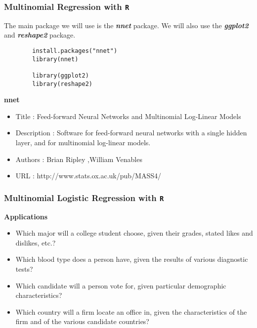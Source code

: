 \documentclass[00-GLMregslides.tex]{subfiles}
\begin{document}
\begin{frame}[fragile]
\frametitle{Multinomial Regression with \texttt{R}}
	\Large
	The main package we will use is the \textbf{\textit{nnet}} package. We will also use the \textbf{\textit{ggplot2}} and \textbf{\textit{reshape2}} package. 
	
	\begin{framed}
		\begin{verbatim}
		install.packages("nnet")
		library(nnet)
		
		library(ggplot2)
		library(reshape2)
		\end{verbatim}
	\end{framed}
	
\end{frame}
\begin{frame}
	\textbf{nnet}
	
	\begin{itemize}
		\item Title : Feed-forward Neural Networks and Multinomial Log-Linear Models
		\item Description : Software for feed-forward neural networks with a single
		hidden layer, and for multinomial log-linear models.
		\item Authors : Brian Ripley ,William Venables 
		\item URL : http://www.stats.ox.ac.uk/pub/MASS4/
	\end{itemize}
	
\end{frame}
\begin{frame}[fragile]		
	\frametitle{Multinomial Logistic Regression with \texttt{R} }	
	\Large	
		\textbf{Applications}
\begin{itemize}		
\item	Which major will a college student choose, given their grades, stated likes and dislikes, etc.?	
\item	Which blood type does a person have, given the results of various diagnostic tests?	
\item	Which candidate will a person vote for, given particular demographic characteristics?	
\item	Which country will a firm locate an office in, given the characteristics of the firm and of the various candidate countries?	
\end{itemize}		
\end{frame}		
\end{document}
